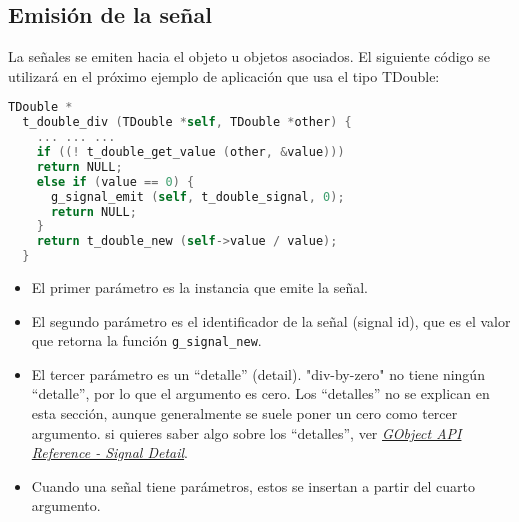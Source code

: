 \subsection{Emisión de la señal}
La señales se emiten hacia el objeto u objetos asociados. El siguiente código se utilizará en
el próximo ejemplo de aplicación que usa el tipo \textsf{TDouble}:
\begin{lstlisting}[language=C, numbers=none]
  TDouble *
  t_double_div (TDouble *self, TDouble *other) {
    ... ... ...
    if ((! t_double_get_value (other, &value)))
    return NULL;
    else if (value == 0) {
      g_signal_emit (self, t_double_signal, 0);
      return NULL;
    }
    return t_double_new (self->value / value);
  }
\end{lstlisting}

\begin{itemize}
  \tightlist
\item El primer parámetro es la instancia que emite la señal.
\item El segundo parámetro es el identificador de la señal (\textsf{signal id}), que es el valor que
  retorna la función \texttt{g\_signal\_new}.
\item El tercer parámetro es un ``detalle'' (\textsf{detail}). \textsf{"div-by-zero"} no tiene ningún ``detalle'',
  por lo que el argumento es cero. Los ``detalles'' no se explican en esta sección, aunque generalmente se
  suele poner un cero como tercer argumento. si quieres saber algo sobre los ``detalles'', ver
  \href{https://docs.gtk.org/gobject/concepts.html#the-detail-argument}
  {\emph{\textsf{GObject API Reference - Signal Detail}}}.
  \item Cuando una señal tiene parámetros, estos se insertan a partir del cuarto argumento.
\end{itemize}





  

